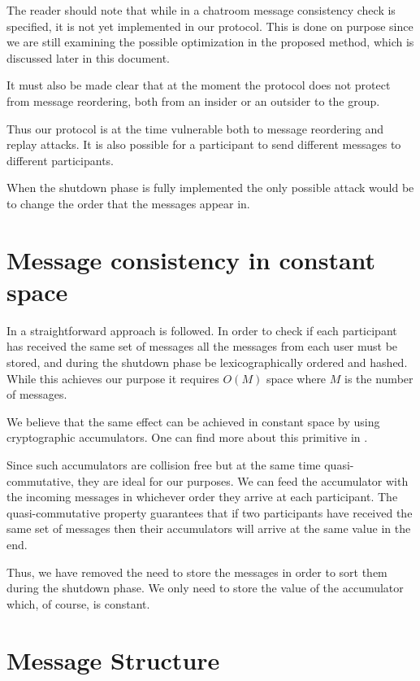 \documentclass[12pt,titlepage,a4paper]{article}
\begin{document}
The reader should note that while in \cite{mpotr} a chatroom message consistency
check is specified, it is not yet implemented in our protocol. This is done on
purpose since we are still examining the possible optimization in the proposed
method, which is discussed later in this document.

It must also be made clear that at the moment the protocol does not protect
from message reordering, both from an insider or an outsider to the group.

Thus our protocol is at the time vulnerable both to message reordering and replay
attacks. It is also possible for a participant to send different messages to
different participants.

When the shutdown phase is fully implemented the only possible attack would be
to change the order that the messages appear in.

\section{Message consistency in constant space}

In \cite{mpotr} a straightforward approach is followed. In order to check if
each participant has received the same set of messages all the messages from
each user must be stored, and during the shutdown phase be lexicographically
ordered and hashed. While this achieves our purpose it requires $O(M)$ space
where $M$ is the number of messages.

We believe that the same effect can be achieved in constant space by using
cryptographic accumulators. One can find more about this primitive in \cite{accum_def}.

Since such accumulators are collision free but at the same time quasi-commutative,
they are ideal for our purposes. We can feed the accumulator with the incoming
messages in whichever order they arrive at each participant. The quasi-commutative
property guarantees that if two participants have received the same set of messages
then their accumulators will arrive at the same value in the end.

Thus, we have removed the need to store the messages in order to sort them during
the shutdown phase. We only need to store the value of the accumulator which,
of course, is constant.


\section{Message Structure}
\end{document}
